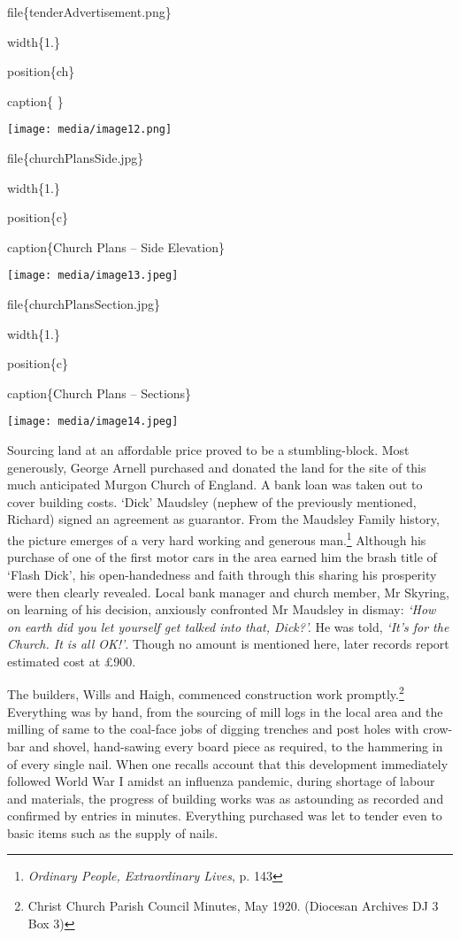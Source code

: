 file\{tenderAdvertisement.png\}

width\{1.\}

position\{ch\}

caption\{ \}

\texttt{[image: media/image12.png]}

file\{churchPlansSide.jpg\}

width\{1.\}

position\{c\}

caption\{Church Plans -- Side Elevation\}

\texttt{[image: media/image13.jpeg]}

file\{churchPlansSection.jpg\}

width\{1.\}

position\{c\}

caption\{Church Plans -- Sections\}

\texttt{[image: media/image14.jpeg]}

Sourcing land at an affordable price proved to be a stumbling-block. Most generously, George Arnell purchased and donated the land for the site of this much anticipated Murgon Church of England. A bank loan was taken out to cover building costs. `Dick' Maudsley (nephew of the previously mentioned, Richard) signed an agreement as guarantor. From the Maudsley Family history, the picture emerges of a very hard working and generous man.\footnote{\emph{Ordinary People, Extraordinary Lives}, p. 143} Although his purchase of one of the first motor cars in the area earned him the brash title of `Flash Dick', his open-handedness and faith through this sharing his prosperity were then clearly revealed. Local bank manager and church member, Mr Skyring, on learning of his decision, anxiously confronted Mr Maudsley in dismay: \emph{`How on earth did you let yourself get talked into that, Dick?'.} He was told, \emph{`It's for the Church. It is all OK!'}. Though no amount is mentioned here, later records report estimated cost at £900.

The builders, Wills and Haigh, commenced construction work promptly.\footnote{Christ Church Parish Council Minutes, May 1920. (Diocesan Archives DJ 3 Box 3)} Everything was by hand, from the sourcing of mill logs in the local area and the milling of same to the coal-face jobs of digging trenches and post holes with crow-bar and shovel, hand-sawing every board piece as required, to the hammering in of every single nail. When one recalls account that this development immediately followed World War I amidst an influenza pandemic, during shortage of labour and materials, the progress of building works was as astounding as recorded and confirmed by entries in minutes. Everything purchased was let to tender even to basic items such as the supply of nails.

